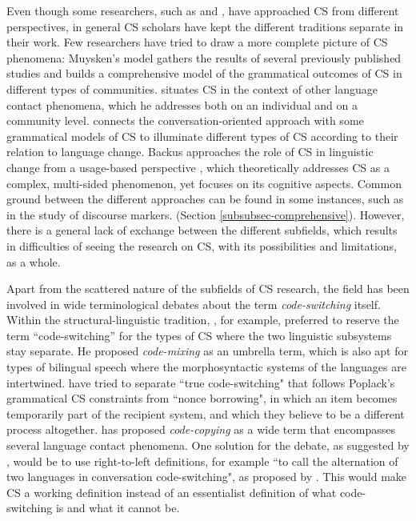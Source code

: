 \documentclass[output=paper]{langscibook}
\begin{document}
Even though some researchers, such as \textcite{myers1993common,myers1997duelling} and \textcite{auer1988conversation,auer1999codeswitching}, have approached CS from different perspectives, in general CS scholars have kept the different traditions separate in their work. Few researchers have tried to draw a more complete picture of CS phenomena: Muysken’s model \parencite{muysken2000,muysken2013language} gathers the results of several previously published studies and builds a comprehensive model of the grammatical outcomes of CS in different types of communities. \textcite{matras2009language} situates CS in the context of other language contact phenomena, which he addresses both on an individual and on a community level. \textcite{auer1999codeswitching} connects the conversation-oriented approach with some grammatical models of CS to illuminate different types of CS according to their relation to language change. Backus approaches the role of CS in linguistic change from a usage-based perspective \parencite{backus2013usage}, which theoretically addresses CS as a complex, multi-sided phenomenon, yet focuses on its cognitive aspects. Common ground between the different approaches can be found in some instances, such as in the study of discourse markers. (Section \ref{subsubsec-comprehensive}). However, there is a general lack of exchange between the different subfields, which results in difficulties of seeing the research on CS, with its possibilities and limitations, as a whole.

Apart from the scattered nature of the subfields of CS research, the field has been involved in wide terminological debates about the term \textit{code-switching} itself. Within the structural-linguistic tradition, \textcite{muysken2000}, for example, preferred to reserve the term ``code-switching'' for the types of CS where the two linguistic subsystems stay separate. He proposed \textit{code-mixing} as an umbrella term, which is also apt for types of bilingual speech where the morphosyntactic systems of the languages are intertwined. \textcite{poplack1998introduction} have tried to separate “true code-switching" that follows Poplack’s grammatical CS constraints from “nonce borrowing", in which an item becomes temporarily part of the recipient system, and which they believe to be a different process altogether. \textcite{johanson2002contact} has proposed \textit{code-copying} as a wide term that encompasses several language contact phenomena. One solution for the debate, as suggested by \textcite{gardner2009code}, would be to use right-to-left definitions, for example “to call the alternation of two languages in conversation code-switching", as proposed by \textcite{janicki1990toward}. This would make CS a working definition instead of an essentialist definition of what code-switching is and what it cannot be.
\end{document}

